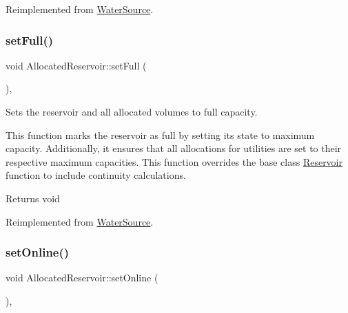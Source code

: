 Reimplemented from \mbox{\hyperlink{classWaterSource_a4a4d948033c57feb8523bd7d5828c59b}{Water\+Source}}.

\mbox{\label{classAllocatedReservoir_aea294cbca1e1630a1307072632d14b05}} 
\subsubsection{\texorpdfstring{set\+Full()}{setFull()}}
{\footnotesize\ttfamily void Allocated\+Reservoir\+::set\+Full (\begin{DoxyParamCaption}{ }\end{DoxyParamCaption})\hspace{0.3cm}{\ttfamily [override]}, {\ttfamily [virtual]}}



Sets the reservoir and all allocated volumes to full capacity. 

This function marks the reservoir as full by setting its state to maximum capacity. Additionally, it ensures that all allocations for utilities are set to their respective maximum capacities. This function overrides the base class {\ttfamily \mbox{\hyperlink{classReservoir}{Reservoir}}} function to include continuity calculations.

\begin{DoxyReturn}{Returns}
void 
\end{DoxyReturn}


Reimplemented from \mbox{\hyperlink{classWaterSource_a86999f23ec7f4fb518adb88e16f156a7}{Water\+Source}}.

\mbox{\label{classAllocatedReservoir_a739d93f7981f597a3db0a3d613304b8e}} 
\subsubsection{\texorpdfstring{set\+Online()}{setOnline()}}
{\footnotesize\ttfamily void Allocated\+Reservoir\+::set\+Online (\begin{DoxyParamCaption}{ }\end{DoxyParamCaption})\hspace{0.3cm}{\ttfamily [override]}, {\ttfamily [virtual]}}



